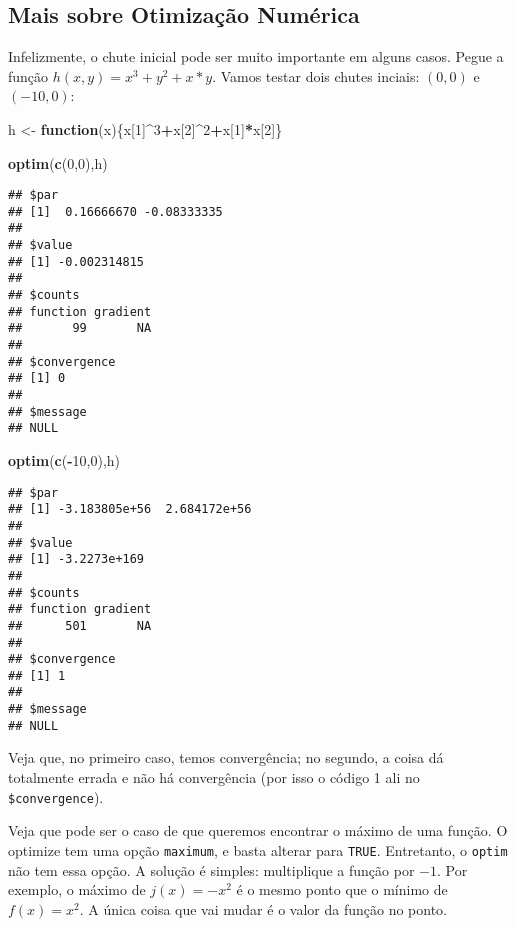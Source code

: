 \documentclass[]{book}
\newenvironment{Shaded}{\begin{snugshade}}{\end{snugshade}}
\newcommand{\KeywordTok}[1]{\textcolor[rgb]{0.13,0.29,0.53}{\textbf{#1}}}
\newcommand{\DecValTok}[1]{\textcolor[rgb]{0.00,0.00,0.81}{#1}}
\newcommand{\StringTok}[1]{\textcolor[rgb]{0.31,0.60,0.02}{#1}}
\newcommand{\ControlFlowTok}[1]{\textcolor[rgb]{0.13,0.29,0.53}{\textbf{#1}}}
\newcommand{\OperatorTok}[1]{\textcolor[rgb]{0.81,0.36,0.00}{\textbf{#1}}}
\newcommand{\NormalTok}[1]{#1}
\begin{document}
\subsection{Mais sobre Otimização
Numérica}\label{mais-sobre-otimizacao-numerica}

Infelizmente, o chute inicial pode ser muito importante em alguns casos.
Pegue a função \(h(x,y)=x^3+y^2+x*y\). Vamos testar dois chutes inciais:
\((0,0)\) e \((-10,0)\):

\begin{Shaded}
\begin{Highlighting}[]
\NormalTok{h <-}\StringTok{ }\ControlFlowTok{function}\NormalTok{(x)\{x[}\DecValTok{1}\NormalTok{]}\OperatorTok{^}\DecValTok{3}\OperatorTok{+}\NormalTok{x[}\DecValTok{2}\NormalTok{]}\OperatorTok{^}\DecValTok{2}\OperatorTok{+}\NormalTok{x[}\DecValTok{1}\NormalTok{]}\OperatorTok{*}\NormalTok{x[}\DecValTok{2}\NormalTok{]\}}

\KeywordTok{optim}\NormalTok{(}\KeywordTok{c}\NormalTok{(}\DecValTok{0}\NormalTok{,}\DecValTok{0}\NormalTok{),h)}
\end{Highlighting}
\end{Shaded}

\begin{verbatim}
## $par
## [1]  0.16666670 -0.08333335
## 
## $value
## [1] -0.002314815
## 
## $counts
## function gradient 
##       99       NA 
## 
## $convergence
## [1] 0
## 
## $message
## NULL
\end{verbatim}

\begin{Shaded}
\begin{Highlighting}[]
\KeywordTok{optim}\NormalTok{(}\KeywordTok{c}\NormalTok{(}\OperatorTok{-}\DecValTok{10}\NormalTok{,}\DecValTok{0}\NormalTok{),h)  }
\end{Highlighting}
\end{Shaded}

\begin{verbatim}
## $par
## [1] -3.183805e+56  2.684172e+56
## 
## $value
## [1] -3.2273e+169
## 
## $counts
## function gradient 
##      501       NA 
## 
## $convergence
## [1] 1
## 
## $message
## NULL
\end{verbatim}

Veja que, no primeiro caso, temos convergência; no segundo, a coisa dá
totalmente errada e não há convergência (por isso o código 1 ali no
\texttt{\$convergence}).

Veja que pode ser o caso de que queremos encontrar o máximo de uma
função. O optimize tem uma opção \texttt{maximum}, e basta alterar para
\texttt{TRUE}. Entretanto, o \texttt{optim} não tem essa opção. A
solução é simples: multiplique a função por \(-1\). Por exemplo, o
máximo de \(j(x)=- x^2\) é o mesmo ponto que o mínimo de \(f(x)=x^2\). A
única coisa que vai mudar é o valor da função no ponto.
\end{document}
